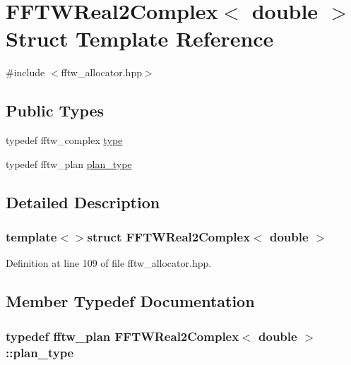 \hypertarget{struct_f_f_t_w_real2_complex_3_01double_01_4}{\section{F\-F\-T\-W\-Real2\-Complex$<$ double $>$ Struct Template Reference}
\label{struct_f_f_t_w_real2_complex_3_01double_01_4}
}


{\ttfamily \#include $<$fftw\-\_\-allocator.\-hpp$>$}

\subsection*{Public Types}
\begin{DoxyCompactItemize}
\item 
typedef fftw\-\_\-complex \hyperlink{struct_f_f_t_w_real2_complex_3_01double_01_4_a1753289e8cc3cad75fe613d8fd3e6f50}{type}
\item 
typedef fftw\-\_\-plan \hyperlink{struct_f_f_t_w_real2_complex_3_01double_01_4_a497a66d13c9dd13df4b27cd0685021d8}{plan\-\_\-type}
\end{DoxyCompactItemize}


\subsection{Detailed Description}
\subsubsection*{template$<$$>$struct F\-F\-T\-W\-Real2\-Complex$<$ double $>$}



Definition at line 109 of file fftw\-\_\-allocator.\-hpp.



\subsection{Member Typedef Documentation}
\hypertarget{struct_f_f_t_w_real2_complex_3_01double_01_4_a497a66d13c9dd13df4b27cd0685021d8}{
\subsubsection[{plan\-\_\-type}]{\setlength{\rightskip}{0pt plus 5cm}typedef fftw\-\_\-plan {\bf F\-F\-T\-W\-Real2\-Complex}$<$ double $>$\-::{\bf plan\-\_\-type}}}\label{struct_f_f_t_w_real2_complex_3_01double_01_4_a497a66d13c9dd13df4b27cd0685021d8}


